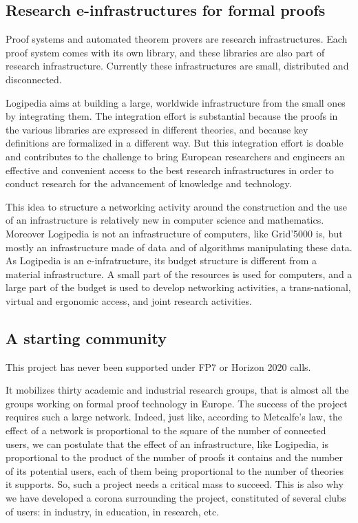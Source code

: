 \subsection{Research e-infrastructures for formal proofs}

Proof systems and automated theorem provers are research
infrastructures. Each proof system comes with its own library, and
these libraries are also part of research infrastructure.  Currently
these infrastructures are small, distributed and disconnected.

Logipedia aims at building a large, worldwide infrastructure from the
small ones by integrating them.  The integration effort is substantial
because the proofs in the various libraries are expressed in different
theories, and because key definitions are formalized in a different
way.  But this integration effort is doable and contributes to the
challenge to bring European researchers and engineers an effective and
convenient access to the best research infrastructures in order to
conduct research for the advancement of knowledge and technology.

This idea to structure a networking activity around the construction
and the use of an infrastructure is relatively new in computer science
and mathematics. Moreover Logipedia is not an infrastructure of
computers, like Grid'5000 is, but mostly an infrastructure made
of data and of algorithms manipulating these data.  As Logipedia
is an e-infratructure, its budget structure is different from a
material infrastructure. A small part of the resources is used for
computers, and a large part of the budget is used to develop
networking activities, a trans-national, virtual and ergonomic access,
and joint research activities.

\subsection{A starting community}

This project has never been supported under FP7 or Horizon 2020 calls.

It mobilizes thirty academic and industrial research groups, that is
almost all the groups working on formal proof technology in Europe.
The success of the project requires such a large network.
Indeed, just like, according to Metcalfe's law, the
effect of a network is proportional to the square of the number of
connected users, we can postulate that the effect of an
infrastructure, like Logipedia, is proportional to the product of the
number of proofs it contains and the number of its potential users,
each of them being proportional to the number of theories it
supports. So, such a project needs a critical mass to succeed. This is
also why we have developed a corona surrounding the project,
constituted of several clubs of users: in industry, in education, in
research, etc. 

